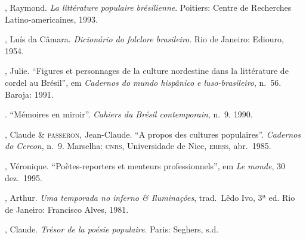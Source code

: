 \begin{bibliografia}[]

, Raymond. \textit{La littérature populaire brésilienne}. 
Poitiers: Centre de Recherches Latino-americaines, 1993.

, Luís da Câmara. \textit{Dicionário do folclore
brasileiro}. Rio de Janeiro: Ediouro, 1954. 

, Julie. “Figures et personnages de la culture 
nordestine dans la littérature de cordel au Brésil”, 
em \textit{Cadernos do mundo hispânico e luso-brasileiro}, n.~56. 
Baroja: 1991.

\titidem. “Mémoires en miroir”. \textit{Cahiers du Brésil
contemporain}, n.~9. 1990.

, Claude \& \textsc{passeron}, Jean-Claude. “A propos 
des cultures populaires”. \textit{Cadernos do Cercon}, n.~9. 
Marselha: \textsc{cnrs}, Universidade de Nice, \textsc{ehess}, abr.~1985. 

, Véronique. “Poètes-reporters et menteurs
professionnels”, em \textit{Le monde}, 30 dez.~1995.

, Arthur. \textit{Uma temporada no inferno \&
Iluminações}, trad.~Lêdo Ivo, 3ª ed. Rio de Janeiro: Francisco Alves,
1981.

, Claude. \textit{Trésor de la poésie populaire}. Paris:
Seghers, s.d.

\end{bibliografia}


